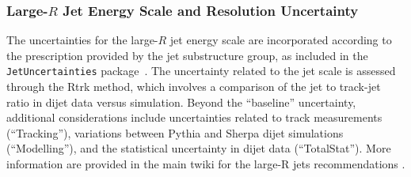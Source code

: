 \subsubsection*{Large-$R$ Jet Energy Scale and Resolution Uncertainty}
\label{sec:fatjetUncert}
The uncertainties for the large-\(R\) jet energy scale are incorporated according to the prescription provided by the jet substructure group, as included in the \texttt{JetUncertainties} package~\cite{JSSrecommendation}. 
The uncertainty related to the jet \pt scale is assessed through the Rtrk method, which involves a comparison of the jet \pt to track-jet \pt ratio in dijet data versus simulation. 
Beyond the ``baseline'' uncertainty, additional considerations include uncertainties related to track measurements (``Tracking''), variations between Pythia and Sherpa dijet simulations (``Modelling''), and the statistical uncertainty in dijet data (``TotalStat'').
More information are provided in the main twiki for the large-R jets recommendations \cite{JSSrecommendation2}.




